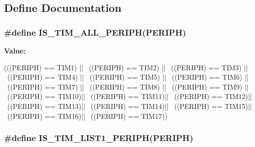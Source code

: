 \subsection{Define Documentation}
\hypertarget{group__TIM__Exported__constants_ga71710da28a59c007a1d2ddee18a5ffcc}{
\subsubsection[{IS\_\-TIM\_\-ALL\_\-PERIPH}]{\setlength{\rightskip}{0pt plus 5cm}\#define IS\_\-TIM\_\-ALL\_\-PERIPH(PERIPH)}}
\label{group__TIM__Exported__constants_ga71710da28a59c007a1d2ddee18a5ffcc}
{\bfseries Value:}
\begin{DoxyCode}
(((PERIPH) == TIM1) || \
                                   ((PERIPH) == TIM2) || \
                                   ((PERIPH) == TIM3) || \
                                   ((PERIPH) == TIM4) || \
                                   ((PERIPH) == TIM5) || \
                                   ((PERIPH) == TIM6) || \
                                   ((PERIPH) == TIM7) || \
                                   ((PERIPH) == TIM8) || \
                                   ((PERIPH) == TIM9) || \
                                   ((PERIPH) == TIM10)|| \
                                   ((PERIPH) == TIM11)|| \
                                   ((PERIPH) == TIM12)|| \
                                   ((PERIPH) == TIM13)|| \
                                   ((PERIPH) == TIM14)|| \
                                   ((PERIPH) == TIM15)|| \
                                   ((PERIPH) == TIM16)|| \
                                   ((PERIPH) == TIM17))
\end{DoxyCode}
\hypertarget{group__TIM__Exported__constants_ga1abea04e3837b7683d8e8dc33441677f}{
\subsubsection[{IS\_\-TIM\_\-LIST1\_\-PERIPH}]{\setlength{\rightskip}{0pt plus 5cm}\#define IS\_\-TIM\_\-LIST1\_\-PERIPH(PERIPH)}}
